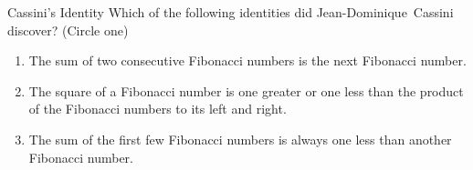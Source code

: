 \documentclass[12pt,letterpaper]{article}
\makeatletter
\newenvironment{problem}{\@startsection
       {section}
       {1}
       {-.2em}
       {-3.5ex plus -1ex minus -.2ex}
       {2.3ex plus .2ex}
       {\pagebreak[3]
       \large\bf\noindent{Problem }
       }
       }
\makeatother
\begin{document}
\begin{problem}{Cassini's Identity}
 Which of the following identities did Jean-Dominique~Cassini discover? (Circle
 one)

 \begin{enumerate}[\hspace{1em}a)]
  \item The sum of two consecutive Fibonacci numbers is the next Fibonacci
  number.
  \item The square of a Fibonacci number is one greater or one less than the
  product of the Fibonacci numbers to its left and right.
  \item The sum of the first few Fibonacci numbers is always one less than
  another Fibonacci number.
 \end{enumerate}
\end{problem}
\end{document}
